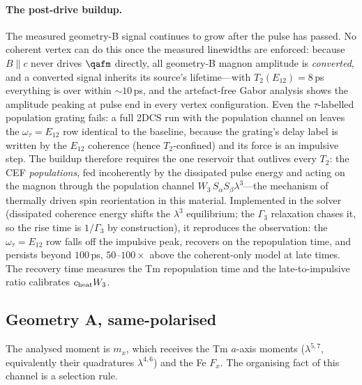 \paragraph{The post-drive buildup.}
The measured geometry-B signal continues to grow after the pulse has
passed.  No coherent vertex can do this once the measured linewidths
are enforced: because $B\!\parallel\!c$ never drives $\qafm$ directly,
all geometry-B magnon amplitude is \emph{converted}, and a converted
signal inherits its source's lifetime---with $T_2(E_{12})=8$\,ps
everything is over within $\sim10$\,ps, and the artefact-free Gabor
analysis shows the amplitude peaking at pulse end in every vertex
configuration.  Even the $\tau$-labelled population grating fails: a
full 2DCS run with the population channel on leaves the
$\omega_\tau=E_{12}$ row identical to the baseline, because the
grating's delay label is written by the $E_{12}$ coherence (hence
$T_2$-confined) and its force is an impulsive step.  The buildup
therefore requires the one reservoir that outlives every $T_2$: the CEF
\emph{populations}, fed incoherently by the dissipated pulse energy and
acting on the magnon through the population channel
$W_3\,S_\alpha S_\beta\lambda^3$---the mechanism of thermally driven
spin reorientation in this material.  Implemented in the solver
(dissipated coherence energy shifts the $\lambda^3$ equilibrium; the
$\Gamma_3$ relaxation chases it, so the rise time is $1/\Gamma_3$ by
construction), it reproduces the observation: the $\omega_\tau=E_{12}$
row falls off the impulsive peak, recovers on the repopulation time,
and persists beyond $100$\,ps, $50$--$100\times$ above the
coherent-only model at late times.  The recovery time measures the Tm
repopulation time and the late-to-impulsive ratio calibrates
$c_{\rm heat}W_3$.

\subsection{Geometry A, same-polarised}
\label{si:peaksAsame}

The analysed moment is $m_x$, which receives the Tm $a$-axis moments
($\lambda^{5,7}$, equivalently their quadratures $\lambda^{4,6}$) and
the Fe $F_x$.  The organising fact of this channel is a selection rule.

